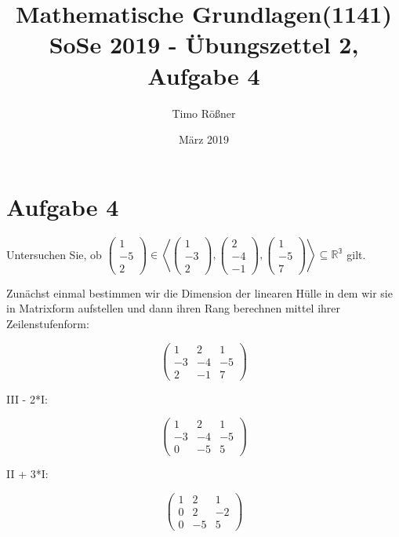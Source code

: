 \documentclass{article}
\title{Mathematische Grundlagen(1141) SoSe 2019 - Übungszettel 2, Aufgabe 4}
\author{Timo Rößner }
\date{März 2019}
\begin{document}
\maketitle

\section*{Aufgabe 4}

Untersuchen Sie, ob
\(
\begin{pmatrix}
    1 \\
    -5 \\
    2
\end{pmatrix}
\in
\left <
\begin{pmatrix}
    1 \\
    -3 \\
    2
\end{pmatrix}
,
\begin{pmatrix}
    2 \\
    -4 \\
    -1
\end{pmatrix}
,
\begin{pmatrix}
    1 \\
    -5 \\
    7
\end{pmatrix}
\right >
\subseteq \mathbb{R^{3}}
\)
gilt.


Zunächst einmal bestimmen wir die Dimension der linearen Hülle in dem wir sie in Matrixform aufstellen und dann ihren Rang berechnen mittel ihrer Zeilenstufenform:

\[
\begin{pmatrix}
    1 & 2 & 1 \\
    -3 & -4 & -5 \\
    2 & -1 & 7
\end{pmatrix}
\]

III - 2*I:

\[
\begin{pmatrix}
    1 & 2 & 1 \\
    -3 & -4 & -5 \\
    0 & -5 & 5
\end{pmatrix}
\]

II + 3*I:

\[
\begin{pmatrix}
    1 & 2 & 1 \\
    0 & 2 & -2 \\
    0 & -5 & 5
\end{pmatrix}
\]
\end{document}
